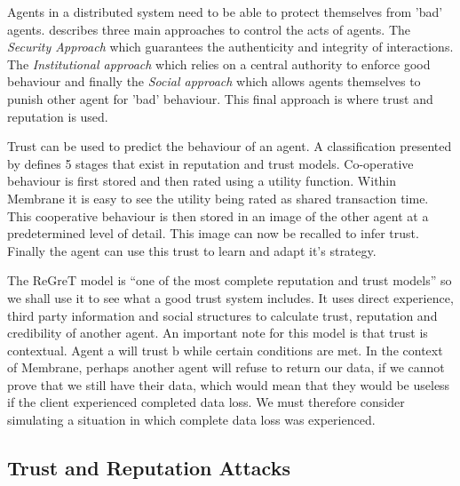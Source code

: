\documentclass[11pt, a4paper, twocolumn, twoside]{report}
\begin{document}
Agents in a distributed system need to be able to protect themselves from 'bad' agents. \cite{pinyol2013computational} describes three main approaches to control the acts of agents. The \emph{Security Approach} which guarantees the authenticity and integrity of interactions. The \emph{Institutional approach} which relies on a central authority to enforce good behaviour and finally the \emph{Social approach} which allows agents themselves to punish other agent for 'bad' behaviour. This final approach is where trust and reputation is used.

Trust can be used to predict the behaviour of an agent. \citep{wooldridge2009introduction} A classification presented by \cite{balke2009using} defines 5 stages that exist in reputation and trust models. Co-operative behaviour is first stored and then rated using a utility function. Within Membrane it is easy to see the utility being rated as shared transaction time. This cooperative behaviour is then stored in an image of the other agent at a predetermined level of detail. This image can now be recalled to infer trust. Finally the agent can use this trust to learn and adapt it's strategy.

The ReGreT model \citep{sabater2001regret} is ``one of the most complete reputation and trust models'' \citep{pinyol2013computational} so we shall use it to see what a good trust system includes. It uses direct experience, third party information and social structures to calculate trust, reputation and credibility of another agent. An important note for this model is that trust is contextual. Agent a will trust b while certain conditions are met. In the context of Membrane, perhaps another agent will refuse to return our data, if we cannot prove that we still have their data, which would mean that they would be useless if the client experienced completed data loss. We must therefore consider simulating a situation in which complete data loss was experienced.

\subsection{Trust and Reputation Attacks}
\end{document}
